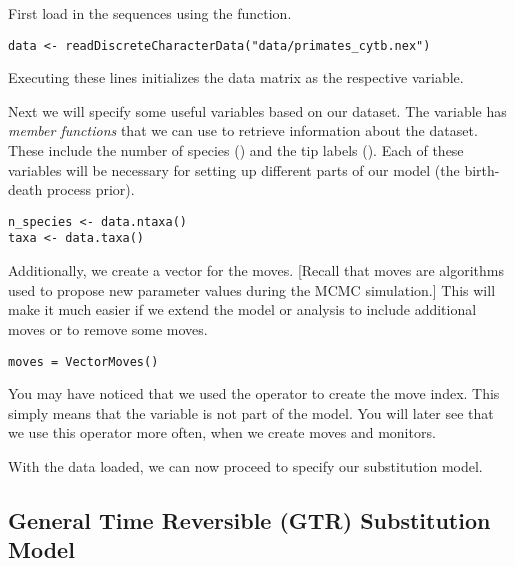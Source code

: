 First load in the sequences using the  function. 
{\tt \begin{snugshade*}
\begin{lstlisting}
data <- readDiscreteCharacterData("data/primates_cytb.nex")
\end{lstlisting}
\end{snugshade*}}
Executing these lines initializes the data matrix as the respective \Rev variable. 

Next we will specify some useful variables based on our dataset. 
The variable  has \textit{member functions} that we can use to retrieve information about the dataset. 
These include the number of species () and the tip labels ().
Each of these variables will be necessary for setting up different parts of our model (\EG the birth-death process prior).
{\tt \begin{snugshade*}
\begin{lstlisting}
n_species <- data.ntaxa()
taxa <- data.taxa()	
\end{lstlisting}
\end{snugshade*}}

Additionally, we create a vector for the moves.
[Recall that moves are algorithms used to propose new parameter values during the MCMC simulation.]
This will make it much easier if we extend the model or analysis to include additional moves or to remove some moves.
{\tt \begin{snugshade*}
\begin{lstlisting}
moves = VectorMoves() 
\end{lstlisting}
\end{snugshade*}}
You may have noticed that we used the \cl{=} operator to create the move index.
This simply means that the variable is not part of the model.
You will later see that we use this operator more often, \EG when we create moves and monitors.

With the data loaded, we can now proceed to specify our substitution model.



\subsection{General Time Reversible (GTR) Substitution Model}

